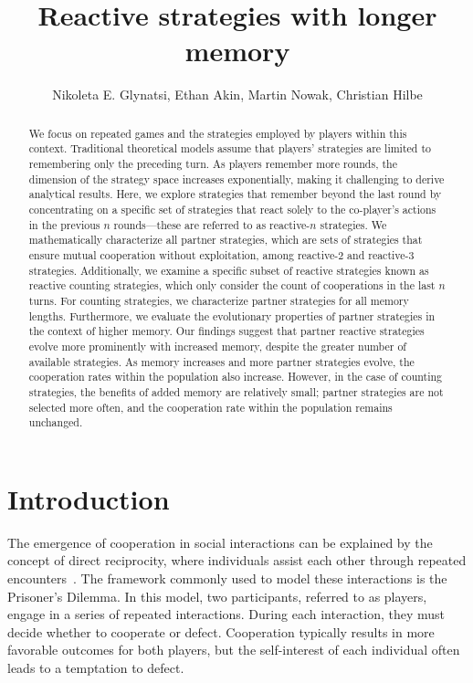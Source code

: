 \documentclass{article}
\title{Reactive strategies with longer memory}
\author{Nikoleta E. Glynatsi, Ethan Akin, Martin Nowak, Christian Hilbe}
\date{}
\theoremstyle{definition}
\begin{document}
\maketitle

\begin{abstract}

We focus on repeated games and the strategies employed by players within this
context. Traditional theoretical models assume that players' strategies are
limited to remembering only the preceding turn. As players remember more
rounds, the dimension of the strategy space increases exponentially, making it
challenging to derive analytical results. Here, we explore strategies that
remember beyond the last round by concentrating on a specific set of
strategies that react solely to the co-player's actions in the previous $n$
rounds—these are referred to as reactive-$n$ strategies. We mathematically
characterize all partner strategies, which are sets of strategies that ensure
mutual cooperation without exploitation, among reactive-2 and reactive-3
strategies. Additionally, we examine a specific subset of reactive strategies
known as reactive counting strategies, which only consider the count of
cooperations in the last $n$ turns. For counting strategies, we
characterize partner strategies for all memory lengths. Furthermore, we evaluate
the evolutionary properties of partner strategies in the context of higher
memory. Our findings suggest that partner reactive strategies evolve more
prominently with increased memory, despite the greater number of available
strategies. As memory increases and more partner strategies evolve, the
cooperation rates within the population also increase. However, in the case of
counting strategies, the benefits of added memory are relatively small; partner
strategies are not selected more often, and the cooperation rate within the
population remains unchanged.

\end{abstract}

\section{Introduction}

The emergence of cooperation in social interactions can be explained by the
concept of direct reciprocity, where individuals assist each other through
repeated encounters~\cite{axelrod:AAAS:1981, nowak:Science:2006, sigmund2010}.
The framework commonly used to model these interactions is the Prisoner's
Dilemma. In this model, two participants, referred to as players, engage in a
series of repeated interactions. During each interaction, they must decide
whether to cooperate or defect. Cooperation typically results in more favorable
outcomes for both players, but the self-interest of each individual often leads
to a temptation to defect.
\end{document}
